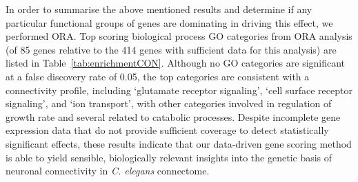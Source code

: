 \documentclass[10pt,letterpaper]{article}
\begin{document}
{In order to summarise the above mentioned results and determine if any particular functional groups of genes are dominating in driving this effect, we performed ORA. 
Top scoring biological process GO categories from ORA analysis (of 85 genes relative to the 414 genes with sufficient data for this analysis) are listed in Table~\ref{tab:enrichmentCON}.
Although no GO categories are significant at a false discovery rate of 0.05, the top categories are consistent with a connectivity profile, including `glutamate receptor signaling', `cell surface receptor signaling', and `ion transport', with other categories involved in regulation of growth rate and several related to catabolic processes.
Despite incomplete gene expression data that do not provide sufficient coverage to detect statistically significant effects, these results indicate that our data-driven gene scoring method is able to yield sensible, biologically relevant insights into the genetic basis of neuronal connectivity in \textit{C. elegans} connectome.\\
}
\end{document}
